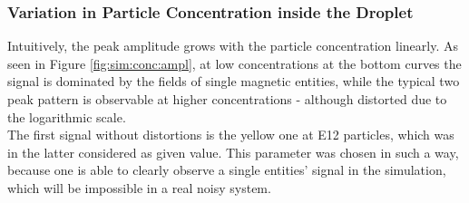 \subsubsection{Variation in Particle Concentration inside the Droplet}
Intuitively, the peak amplitude grows with the particle concentration linearly.  As seen in Figure \ref{fig:sim:conc:ampl}, at low concentrations at the bottom curves the signal is dominated by the fields of single magnetic entities, while the typical two peak pattern is observable at higher concentrations - although distorted due to the logarithmic scale.\\
The first signal without distortions is the yellow one at \num{E12} particles, which was in the latter considered as given value. This parameter was chosen in such a way, because one is able to clearly observe a single entities' signal in the simulation, which will be impossible in a real noisy system.
